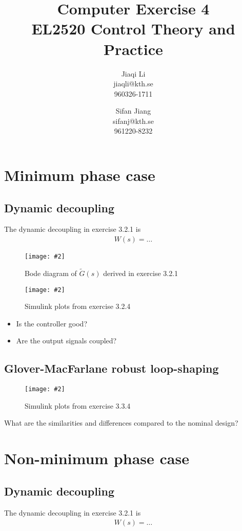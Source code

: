 \documentclass[11pt,a4paper]{article}
\title{
	Computer Exercise 4\\
	EL2520 Control Theory and Practice
}
\author{
	Jiaqi Li\\
	jiaqli@kth.se\\
	960326-1711
	\and
	Sifan Jiang\\
	sifanj@kth.se\\
	961220-8232
}
\newcommand{\image}[3]{
	\begin{figure}[!ht]
		\centering
	    \texttt{[image: \#2]}
		\caption{#3}
		\label{fig:#2}
	\end{figure}
}
\begin{document}
\maketitle


\section*{Minimum phase case}
\subsection*{Dynamic decoupling}
\par The dynamic decoupling in exercise 3.2.1 is
	\begin{align*}
		W(s) = \ldots
	\end{align*}
	
	\image{0.5}{figure_1.pdf}{Bode diagram of $\tilde{G}(s)$ derived in exercise 3.2.1}
	\image{0.5}{figure_2.pdf}{Simulink plots from exercise 3.2.4}

	\begin{itemize}
		\item Is the controller good?
		\item Are the output signals coupled?
	\end{itemize}

\subsection*{Glover-MacFarlane robust loop-shaping}
	\image{0.5}{figure_3.pdf}{Simulink plots from exercise 3.3.4}

\par What are the similarities and differences compared to the nominal design?
	\par\dotfill\par\dotfill

	
\section*{Non-minimum phase case}
\subsection*{Dynamic decoupling}
\par The dynamic decoupling in exercise 3.2.1 is
	\begin{align*}
		W(s) = \ldots
	\end{align*}
\end{document}
